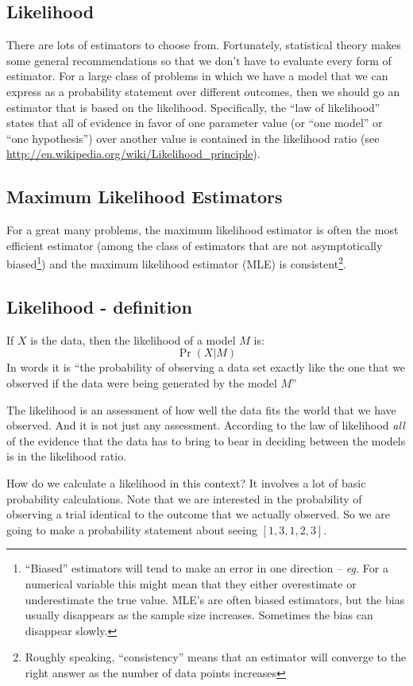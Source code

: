 \documentclass[11pt]{article}
\begin{document}
\subsection*{Likelihood}
There are lots of estimators to choose from. 
Fortunately, statistical theory makes some general recommendations so that we don't have to evaluate every form of estimator.
For a large class of problems in which we have a model that we can express as a probability statement over different outcomes, then we should go an estimator that is based on the likelihood.
Specifically, the ``law of likelihood'' states that all of evidence in favor of one parameter value (or ``one model'' or ``one hypothesis'') over another value is contained in the likelihood ratio (see \url{http://en.wikipedia.org/wiki/Likelihood_principle}).

\subsection*{Maximum Likelihood Estimators}
For a great many problems, the maximum likelihood estimator is often the most efficient estimator (among the class of estimators that are not asymptotically biased\footnote{``Biased'' estimators will tend to make an error in one direction -- {\em eg.} For a numerical variable this might mean that they either overestimate or underestimate the true value.  MLE's are often biased estimators, but the bias usually disappears as the sample size increases.  Sometimes the bias can disappear slowly.}) and the maximum likelihood estimator (MLE) is consistent\footnote{Roughly speaking, ``consistency'' means that an estimator will converge to the right answer as the number of data points increases}.

\subsection*{Likelihood - definition}
If $X$ is the data, then the likelihood of a model $M$ is: $$\Pr(X|M)$$
In words it is ``the probability of observing a data set exactly like the one that we observed if the data were being generated by the model $M$''

The likelihood is an assessment of how well the data fits the world that we have observed.  And it is not just any assessment. According to the law of likelihood {\em all} of the evidence that the data has to bring to bear in deciding between the models is in the likelihood ratio.

How do we calculate a likelihood in this context? It involves a lot of basic probability calculations.
Note that we are interested in the probability of observing a trial identical to the outcome that we actually observed.  So we are going to make a probability statement about seeing $[1, 3, 1, 2, 3]$.
\end{document}

